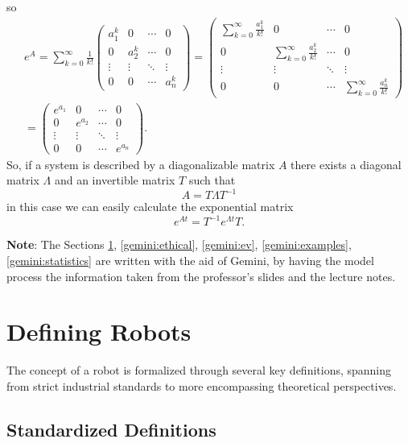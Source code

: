 \documentclass[10pt, letterpaper]{report}
\begin{document}
so\begin{align}
    &e^A=\sum_{k=0}^\infty\frac{1}{k!}\begin{pmatrix}
a_1^k & 0 & \cdots & 0 \\
0 & a_2^k & \cdots & 0 \\
\vdots & \vdots & \ddots & \vdots \\
0 & 0 & \cdots & a_n^k
\end{pmatrix}=
\begin{pmatrix}
\sum_{k=0}^\infty\frac{a_1^k}{k!} & 0 & \cdots & 0 \\
0 & \sum_{k=0}^\infty\frac{a_2^k}{k!} & \cdots & 0 \\
\vdots & \vdots & \ddots & \vdots \\
0 & 0 & \cdots & \sum_{k=0}^\infty\frac{a_n^k}{k!}
\end{pmatrix}\\& =
\begin{pmatrix}
e^{a_1} & 0 & \cdots & 0 \\
0 & e^{a_2} & \cdots & 0 \\
\vdots & \vdots & \ddots & \vdots \\
0 & 0 & \cdots & e^{a_n}
\end{pmatrix}.
\end{align}
So, if a system is described by a diagonalizable matrix $A$ there exists a diagonal matrix 
$\Lambda$ and an invertible matrix $T$ such that\begin{equation}
    A=T\Lambda T^{-1}
\end{equation}
in this case we can easily calculate the exponential matrix\begin{equation}
    e^{At}=T^{-1}e^{\Lambda t} T.
\end{equation}

\noindent\textbf{Note}: The Sections  \ref{gemini:def}, \ref{gemini:ethical}, \ref{gemini:ev}, \ref{gemini:examples}, \ref{gemini:statistics} are written with the aid of Gemini, by having the model process the information taken from the professor's slides and the lecture notes.

\section{Defining Robots}\label{gemini:def}
The concept of a robot is formalized through several key definitions, spanning from strict industrial standards to more encompassing theoretical perspectives.

\subsection{Standardized Definitions}
\end{document}
